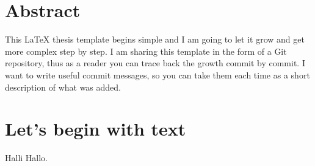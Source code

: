\documentclass[11pt,a4paper,twoside,titlepage]{book}
\begin{document}
\frontmatter
\chapter{Abstract}%
This LaTeX thesis template begins simple and I am going to let it grow and get more complex step by step. I am sharing this template in the form of a Git repository, thus as a reader you can trace back the growth commit by commit. I want to write useful commit messages, so you can take them each time as a short description of what was added.

\mainmatter
\chapter{Let's begin with text}%
Halli Hallo.
\end{document}
